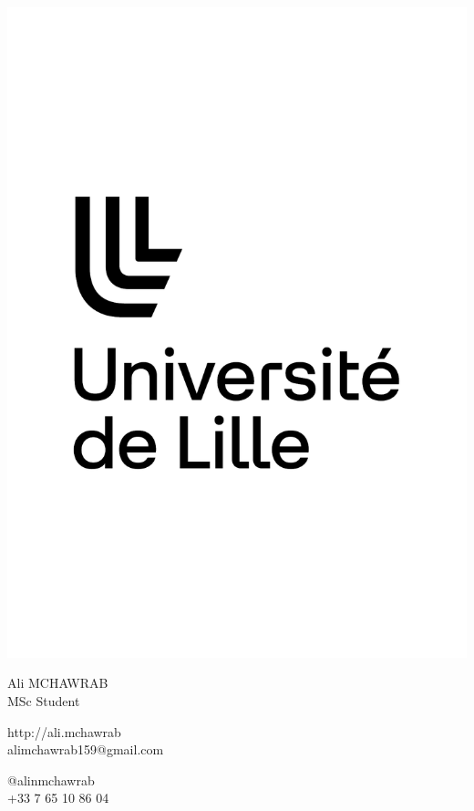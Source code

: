 \documentclass{article}
\begin{document}
\centering \includegraphics[width=.25\linewidth]{logo}\\[5pt]
\parbox{2in}{\Large \centering Ali MCHAWRAB\\[1pt]
\normalsize MSc Student}

\vfill
\raggedright
\begin{multicols}{2}
http://ali.mchawrab\\
alimchawrab159@gmail.com

\columnbreak
\raggedleft
@alinmchawrab\\
+33 7 65 10 86 04%
\end{multicols}%
\end{document}
